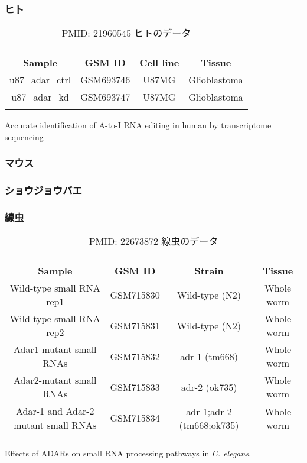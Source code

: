 \subsubsection{ヒト}

\begin{longtable}{cccc}
	\vspace{-0.5cm}
	\label{tab:darned}\\
	\caption{PMID: 21960545 ヒトのデータ}\\
	\cline{1-4}
	\textbf{Sample} & \textbf{GSM ID} & \textbf{Cell line} & \textbf{Tissue} \\
	\cline{1-4}
	u87\_adar\_ctrl & GSM693746 & U87MG & Glioblastoma \\
	u87\_adar\_kd & GSM693747 & U87MG & Glioblastoma \\
	\cline{1-4}
	\vspace{-0.8cm}
\end{longtable}
\begin{flushleft}
	\small{Accurate identification of A-to-I RNA editing in human by transcriptome sequencing}
\end{flushleft}

\subsubsection{マウス}
\subsubsection{ショウジョウバエ}
\subsubsection{線虫}
\begin{longtable}{cccc}
	\vspace{-0.5cm}
	\label{tab:darned}\\
	\caption{PMID: 22673872 線虫のデータ}\\
	\cline{1-4}
	\textbf{Sample} & \textbf{GSM ID} & \textbf{Strain} & \textbf{Tissue} \\
	\cline{1-4}
	Wild-type small RNA rep1 & GSM715830 & Wild-type (N2) & Whole worm \\
	Wild-type small RNA rep2& GSM715831 & Wild-type (N2) & Whole worm \\
	Adar1-mutant small RNAs & GSM715832 & adr-1 (tm668) & Whole worm \\
	Adar2-mutant small RNAs & GSM715833  & adr-2 (ok735) & Whole worm \\
	Adar-1 and Adar-2 mutant small RNAs　& GSM715834 & adr-1;adr-2 (tm668;ok735) & Whole worm \\
	\cline{1-4}
	\vspace{-0.8cm}
\end{longtable}
\begin{flushleft}
	\small{Effects of ADARs on small RNA processing pathways in \textit{C. elegans}.}
\end{flushleft}

